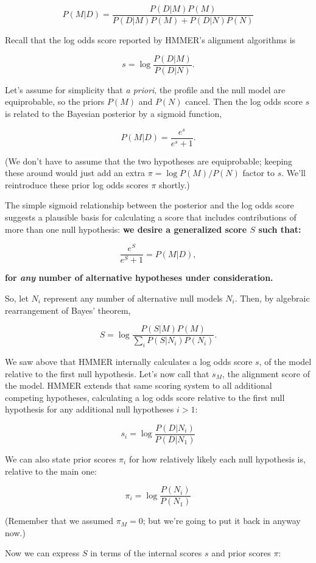 \[
   P(M | D) = \frac{P(D | M) P(M)}{P(D | M) P(M) + P(D | N) P(N)}
\]

Recall that the log odds score reported by HMMER's alignment
algorithms is

\[
  s = \log \frac{P(D | M)}{P(D | N)}.
\]

Let's assume for simplicity that \emph{a priori}, the profile and the
null model are equiprobable, so the priors $P(M)$ and $P(N)$
cancel. Then the log odds score $s$ is related to the Bayesian
posterior by a sigmoid function,

\[
  P(M | D) = \frac{e^s}{e^s + 1}.
\]

(We don't have to assume that the two hypotheses are equiprobable;
keeping these around would just add an extra $\pi = \log P(M) / P(N)$
factor to $s$. We'll reintroduce these prior log odds scores $\pi$
shortly.)

The simple sigmoid relationship between the posterior and the log odds
score suggests a plausible basis for calculating a score that includes
contributions of more than one null hypothesis: \textbf{we desire a
generalized score $S$ such that:}

\[
  \frac{e^S}{e^S + 1} = P(M | D),
\]

\textbf{for \emph{any} number of alternative hypotheses under consideration.}

So, let $N_i$ represent any number of alternative null models
$N_i$. Then, by algebraic rearrangement of Bayes' theorem,

\[
   S = \log \frac{P(S | M) P(M)}{ \sum_{i} P(S | N_i) P(N_i)}. 
\]

We saw above that HMMER internally calculates a log odds score $s$, of
the model relative to the first null hypothesis. Let's now call that
$s_M$, the alignment score of the model. HMMER extends that same
scoring system to all additional competing hypotheses, calculating a
log odds score relative to the first null hypothesis for any
additional null hypotheses $i > 1$:

\[
  s_i = \log \frac{P(D | N_i)}{P(D | N_1)}
\]

We can also state prior scores $\pi_i$ for how relatively likely
each null hypothesis is, relative to the main one:

\[
  \pi_i = \log \frac{P(N_i)}{P(N_1)}
\]

(Remember that we assumed $\pi_M = 0$; but we're going to put it back
in anyway now.)

Now we can express $S$ in terms of the internal scores $s$ and
prior scores $\pi$:

